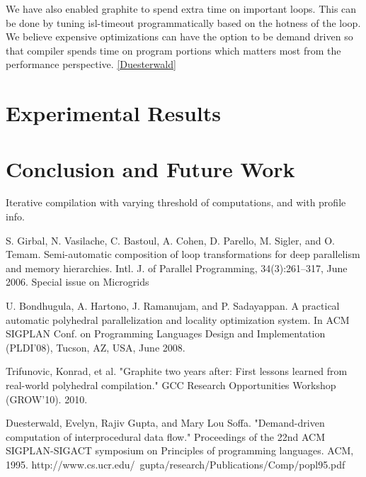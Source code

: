 We have also enabled graphite to spend extra time on important loops. This can be done by tuning
isl-timeout programmatically based on the hotness of the loop. We believe expensive optimizations
can have the option to be demand driven so that compiler spends time on program portions which matters
most from the performance perspective. \ref{Duesterwald}


\section{Experimental Results}

\section{Conclusion and Future Work}
Iterative compilation with varying threshold of computations, and with profile info.



S. Girbal, N. Vasilache, C. Bastoul, A. Cohen, D. Parello, M. Sigler, and O. Temam.
Semi-automatic composition of loop transformations for deep parallelism and memory
hierarchies. Intl. J. of Parallel Programming, 34(3):261–317, June 2006. Special issue on
Microgrids


U. Bondhugula, A. Hartono, J. Ramanujam, and P. Sadayappan. A practical automatic
polyhedral parallelization and locality optimization system. In ACM SIGPLAN Conf. on
Programming Languages Design and Implementation (PLDI’08), Tucson, AZ, USA, June
2008.

Trifunovic, Konrad, et al. "Graphite two years after: First lessons learned
from real-world polyhedral compilation."
GCC Research Opportunities Workshop (GROW'10). 2010.


Duesterwald, Evelyn, Rajiv Gupta, and Mary Lou Soffa. "Demand-driven computation of interprocedural data flow." Proceedings of the 22nd ACM SIGPLAN-SIGACT symposium on Principles of programming languages. ACM, 1995.
http://www.cs.ucr.edu/~gupta/research/Publications/Comp/popl95.pdf

